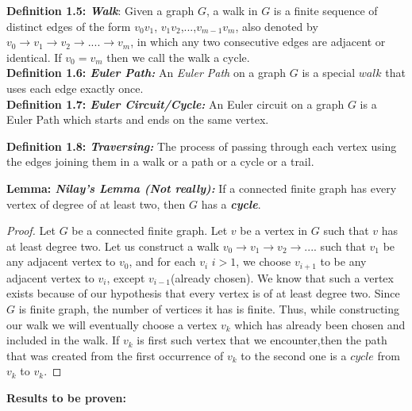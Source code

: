 \documentclass[12pt, fullpage]{article}
\begin{document}
\textbf{Definition 1.5: \textit{Walk}}: Given a graph $G$, a walk in $G$ is a finite sequence of distinct edges of the form $v_0v_1$, $v_1v_2$,...,$v_{m-1}v_m$, also denoted by $v_0 \rightarrow v_1 \rightarrow v_2 \rightarrow ....\rightarrow v_m$, in which any two consecutive edges are adjacent or identical.  If $v_0 = v_m$ then we call the walk a cycle.\\

\textbf{Definition 1.6: \textit{Euler Path: }}An \textit{Euler Path} on a graph $G$ is a special $walk$ that uses each edge exactly once.\\
\textbf{Definition 1.7: \textit{Euler Circuit/Cycle: }}An Euler circuit on a graph $G$ is a Euler Path which starts and ends on the same vertex.

\textbf{Definition 1.8: \textit{Traversing: }}The process of passing through each vertex using the edges joining them in a walk or a path or a cycle or a trail.

\textbf{Lemma: \textit{Nilay's Lemma (Not really):}} If a connected finite graph has every vertex of degree of at least two, then $G$ has a \textit{\textbf{cycle}}.
\begin{proof}
Let $G$ be a connected finite graph. Let $v$ be a vertex in $G$ such that $v$ has at least degree two. Let us construct a walk $v_0 \rightarrow v_1 \rightarrow v_2 \rightarrow ....$ such that $v_1$ be any adjacent vertex to $v_0$, and for each $v_i$ $i > 1$, we choose $v_{i+1}$ to be any adjacent vertex to $v_i$, except $v_{i-1}$(already chosen). We know that such a vertex exists because of our hypothesis that every vertex is of at least degree two. Since $G$ is finite graph, the number of vertices it has is finite. Thus, while constructing our walk we will eventually choose a vertex $v_k$ which has already been chosen and included in the walk. If $v_k$ is first such vertex that we encounter,then the path that was created from the first occurrence of $v_k$ to the second one is a $cycle$ from $v_k$ to $v_k$.
\end{proof}

\textbf{Results to be proven: }
\end{document}
